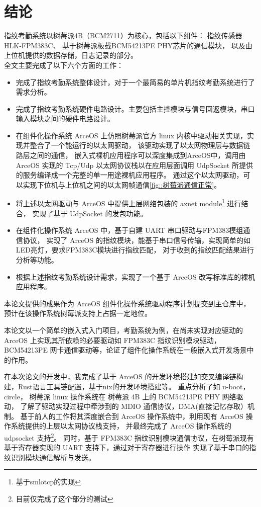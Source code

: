\section{结论}
    指纹考勤系统以树莓派4B（BCM2711）为核心，包括以下组件：
    指纹传感器HLK-FPM383C、
    基于树莓派板载BCM54213PE PHY芯片的通信模块，
    以及由上位机提供的数据存储，日志记录的部分。\\

    \noindent 全文主要完成了以下六个方面的工作：

    \begin{itemize}
        \item 完成了指纹考勤系统整体设计，对于一个最简易的单片机指纹考勤系统进行了需求分析。
        \item 完成了指纹考勤系统硬件电路设计。主要包括主控模块与信号回返模块，串口输入模块之间的硬件电路设计。
        \item 在组件化操作系统 ArceOS 上仿照树莓派官方 linux 内核中驱动相关实现，实现并整合了一个能运行的以太网驱动，
            该驱动实现了以太网物理层与数据链路层之间的通信，
            嵌入式裸机应用程序可以深度集成到ArceOS中，调用由 ArceOS 实现的 Tcp/Udp 以太网协议栈以在应用层面调用 UdpSocket 所提供的服务编译成一个完整的单一用途裸机应用程序。
            通过这个以太网驱动，可以实现下位机与上位机之间的以太网帧通信\ref{fig::树莓派通信正常}。
        \item 将上述以太网驱动与 ArceOS 中提供上层网络包装的 axnet module\footnote{基于smlotcp的实现} 进行结合，
            实现了基于 UdpSocket 的发包功能。
        \item 在组件化操作系统 ArceOS 中，基于自建 UART 串口驱动与FPM383模组通信协议\cite{fpm383c-modular-communication-protocol}，
            实现了 ArceOS 的指纹模块，能基于串口信号传输，实现简单的如LED亮灯，要求FPM383C模块进行指纹匹配，
            对于收到的指纹匹配结果进行分析等功能。
        \item 根据上述指纹考勤系统设计需求，实现了一个基于 ArceOS 改写标准库的裸机应用程序。
    \end{itemize}


本论文提供的成果作为 ArceOS 组件化操作系统驱动程序计划提交到主仓库中，预计在该操作系统树莓派支持上占据一定地位。

本论文以一个简单的嵌入式入门项目，考勤系统为例，在尚未实现对应驱动的 ArceOS 上实现其所依赖的必要驱动如 
FPM383C 指纹识别模块驱动，BCM54213PE 网卡通信驱动等，论证了组件化操作系统在一般嵌入式开发场景中的作用。

在本次论文的开发中，我完成了基于 ArceOS 的开发环境搭建如交叉编译链构建，Rust语言工具链配置，基于nix的开发环境搭建等。
重点分析了如 u-boot， circle， 树莓派 linux 操作系统在 树莓派 4B 上的 BCM54213PE PHY 网络驱动，
了解了驱动实现过程中牵涉到的 MDIO 通信协议，DMA(直接记忆存取）机制。
基于前人的工作将其深度嵌合到 ArceOS 操作系统中，利用现有 ArceOS 操作系统提供的上层以太网协议栈支持，
并最终完成了 ArceOS 操作系统的 udpsocket 支持\footnote{目前仅完成了这个部分的测试}。
同时，基于 FPM383C 指纹识别模块通信协议，在树莓派现有基于寄存器实现的 UART 支持下，通过对于寄存器进行操作
实现了基于串口的指纹识别模块通信解析与发送。

